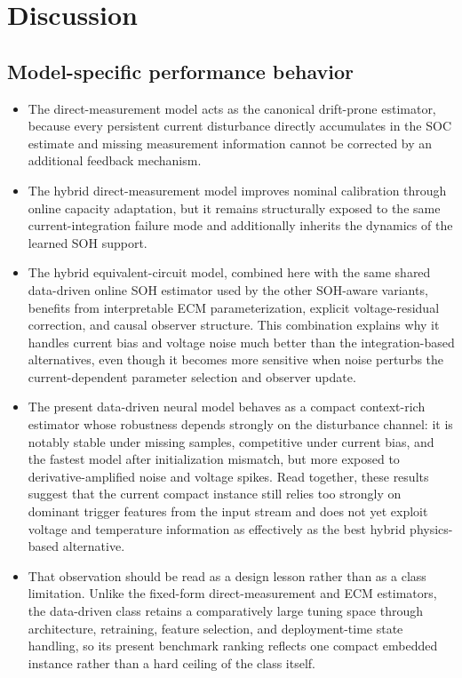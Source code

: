 \documentclass[review]{elsarticle}
\begin{document}
\section{Discussion}
\subsection{Model-specific performance behavior}
\begin{itemize}[leftmargin=*]
    \item The direct-measurement model acts as the canonical drift-prone estimator, because every persistent current disturbance directly accumulates in the SOC estimate and missing measurement information cannot be corrected by an additional feedback mechanism.
    \item The hybrid direct-measurement model improves nominal calibration through online capacity adaptation, but it remains structurally exposed to the same current-integration failure mode and additionally inherits the dynamics of the learned SOH support.
    \item The hybrid equivalent-circuit model, combined here with the same shared data-driven online SOH estimator used by the other SOH-aware variants, benefits from interpretable ECM parameterization, explicit voltage-residual correction, and causal observer structure. This combination explains why it handles current bias and voltage noise much better than the integration-based alternatives, even though it becomes more sensitive when noise perturbs the current-dependent parameter selection and observer update.
    \item The present data-driven neural model behaves as a compact context-rich estimator whose robustness depends strongly on the disturbance channel: it is notably stable under missing samples, competitive under current bias, and the fastest model after initialization mismatch, but more exposed to derivative-amplified noise and voltage spikes. Read together, these results suggest that the current compact instance still relies too strongly on dominant trigger features from the input stream and does not yet exploit voltage and temperature information as effectively as the best hybrid physics-based alternative.
    \item That observation should be read as a design lesson rather than as a class limitation. Unlike the fixed-form direct-measurement and ECM estimators, the data-driven class retains a comparatively large tuning space through architecture, retraining, feature selection, and deployment-time state handling, so its present benchmark ranking reflects one compact embedded instance rather than a hard ceiling of the class itself.
\end{itemize}
\end{document}
